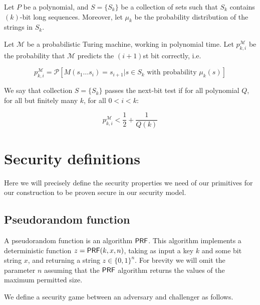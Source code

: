 \documentclass[12pt]{article}
\begin{document}
Let $P$ be a polynomial, and $S=\{S_k\}$ be a collection of sets such that $S_k$ contains $(k)$-bit long sequences. Moreover, let $\mu_k$ be the probability distribution of the strings in $S_k$.

Let $\mathcal{M}$ be a probabilistic Turing machine, working in polynomial time. Let $p_{k,i}^{\mathcal{M}}$ be the probability that $\mathcal{M}$ predicts the $(i+1)$st bit correctly, i.e.

$$p_{k,i}^{\mathcal{M}}={\mathcal{P}}[M(s_1\ldots s_i)=s_{i+1} | s\in S_k\text{ with probability }\mu_k(s)]$$

We say that collection $S = \{ S_k \}$ passes the next-bit test if for all polynomial $Q$, for all but finitely many $k$, for all $0 < i < k$: 

$$
p_{k,i}^{\mathcal M}<\frac{1}{2}+\frac{1}{Q(k)}
$$

\section{Security definitions} \label{sec:def}

Here we will precisely define the security properties we need of our primitives for our construction to be proven secure in our security model.

\subsection{Pseudorandom function} \label{PRFdef}


A pseudorandom function is an algorithm $\mathsf{PRF}$. This algorithm implements a deterministic function $z=\mathsf{PRF}(k, x, n)$, taking as input a key $k$ and some bit string $x$, and returning a string $z \in \{0, 1 \}^{n}$. For brevity we will omit the parameter $n$ assuming that the $\mathsf{PRF}$ algorithm returns the values of the maximum permitted size.

We define a security game between an adversary and challenger as follows.
\end{document}
